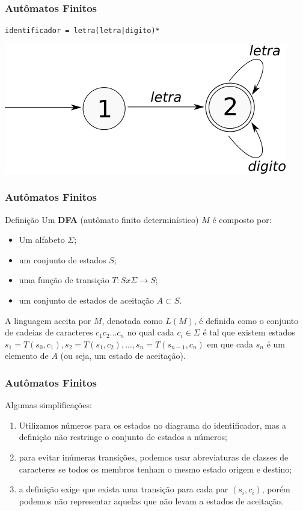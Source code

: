 \documentclass[table]{beamer}
\begin{document}
\begin{frame}[fragile]
   \frametitle{Autômatos Finitos}
   \begin{verbatim}
identificador = letra(letra|digito)*
   \end{verbatim}
   \includegraphics[width=\linewidth,height=\textheight,keepaspectratio]{figuras/automatofinitoidentificadores.png}
\end{frame}

\begin{frame}
   \frametitle{Autômatos Finitos}
   \begin{block}{Definição}
   Um \textbf{DFA} (autômato finito determinístico) $M$ é composto por:
      \begin{itemize}
         \item Um alfabeto $\Sigma$;
	 \item um conjunto de estados $S$;
	 \item uma função de transição $T:S x \Sigma \to S$;
         \item um conjunto de estados de aceitação $A \subset S$.
      \end{itemize}
   A linguagem aceita por $M$, denotada como $L(M)$, é definida como o conjunto de cadeias de caracteres $c_{1}c_{2}...c_{n}$ no qual cada $c_{i} \in \Sigma$ é tal que existem estados $s_{1}=T(s_{0}, c_{1}), s_{2}=T(s_{1}, c_{2}), ... , s_{n}=T(s_{n-1}, c_{n})$ em que cada $s_{n}$ é um elemento de $A$ (ou seja, um estado de aceitação).  
   \end{block}
\end{frame}

\begin{frame}
   \frametitle{Autômatos Finitos}
   \begin{block}{Algumas simplificações:}
      \begin{enumerate}
         \item Utilizamos números para os estados no diagrama do identificador, mas a definição não restringe o conjunto de estados a números;
	 \item para evitar inúmeras transições, podemos usar abreviaturas de classes de caracteres se todos os membros tenham o mesmo estado origem e destino;
	 \item a definição exige que exista uma transição para cada par $(s_{i}, c_{i})$, porém podemos não representar aquelas que não levam a estados de aceitação.
      \end{enumerate}
   \end{block}
\end{frame}
\end{document}
